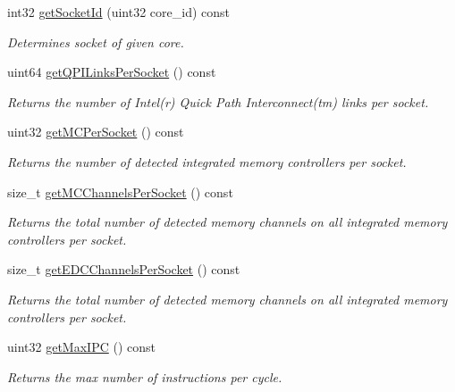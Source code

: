 \begin{DoxyCompactItemize}
int32 \mbox{\hyperlink{class_p_c_m_a015a39143b7bb87b41dc34b43a926029}{get\+Socket\+Id}} (uint32 core\+\_\+id) const
\begin{DoxyCompactList}\small\item\em Determines socket of given core. \end{DoxyCompactList}\item 
uint64 \mbox{\hyperlink{class_p_c_m_af0f62775b214218edf64a3f68df6c932}{get\+Q\+P\+I\+Links\+Per\+Socket}} () const
\begin{DoxyCompactList}\small\item\em Returns the number of Intel(r) Quick Path Interconnect(tm) links per socket. \end{DoxyCompactList}\item 
\mbox{\label{class_p_c_m_af47f2de0de9403d00a4dac72919c8c38}} 
uint32 \mbox{\hyperlink{class_p_c_m_af47f2de0de9403d00a4dac72919c8c38}{get\+M\+C\+Per\+Socket}} () const
\begin{DoxyCompactList}\small\item\em Returns the number of detected integrated memory controllers per socket. \end{DoxyCompactList}\item 
\mbox{\label{class_p_c_m_a8509261ccf013554e4ca31f66edf65af}} 
size\+\_\+t \mbox{\hyperlink{class_p_c_m_a8509261ccf013554e4ca31f66edf65af}{get\+M\+C\+Channels\+Per\+Socket}} () const
\begin{DoxyCompactList}\small\item\em Returns the total number of detected memory channels on all integrated memory controllers per socket. \end{DoxyCompactList}\item 
\mbox{\label{class_p_c_m_a51b8f36a804566a381cba176107ded6d}} 
size\+\_\+t \mbox{\hyperlink{class_p_c_m_a51b8f36a804566a381cba176107ded6d}{get\+E\+D\+C\+Channels\+Per\+Socket}} () const
\begin{DoxyCompactList}\small\item\em Returns the total number of detected memory channels on all integrated memory controllers per socket. \end{DoxyCompactList}\item 
uint32 \mbox{\hyperlink{class_p_c_m_a17084236c1d744a92adec4205415e0ad}{get\+Max\+I\+PC}} () const
\begin{DoxyCompactList}\small\item\em Returns the max number of instructions per cycle. \end{DoxyCompactList}\item 

\end{DoxyCompactItemize}
